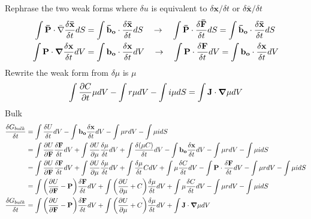 \documentclass[12pt,3p]{article}
\numberwithin{equation}{section}
\begin{document}
Rephrase the two weak forms where $\delta u$ is equivalent to $\delta \mathbf{x} / \delta t$ or $\delta \mathbf{\bar{x}} / \delta t $
\begin{align*}
\int \mathbf{\bar{P}} \cdot \bar{\nabla} \frac{\delta \mathbf{\bar{x}}}{\delta t} dS  &= \int \mathbf{\bar{b}_o} \cdot \frac{\delta \mathbf{\bar{x}}}{\delta t} dS 
\quad \rightarrow \quad 
\int \mathbf{\bar{P}} \cdot \frac{\delta \mathbf{\bar{F}}}{\delta t} dS = \int \mathbf{\bar{b}_o} \cdot \frac{\delta \mathbf{\bar{x}}}{\delta t} dS \\
\int \mathbf{P} \cdot \grad \frac{\delta \mathbf{x}}{\delta t} dV &= \int \mathbf{b_o} \cdot \frac{\delta \mathbf{x}}{\delta t} dV 
\quad \rightarrow \quad 
\int \mathbf{P} \cdot \frac{\delta \mathbf{F}}{\delta t} dV = \int \mathbf{b_o} \cdot \frac{\delta \mathbf{x}}{\delta t} dV
\end{align*}
Rewrite the weak form from $\delta \mu$ is $\mu$
\begin{align*}
\int \pdv{C}{t}  \mu dV - \int r \mu dV - \int i \mu dS = \int \mathbf{J} \cdot \grad \mu dV
\end{align*}
Bulk 
\begin{align*}
 \frac{\delta G_{bulk}}{\delta t} &= \int \frac{\delta U}{\delta t} dV  - \int \mathbf{b_o} \frac{\delta \mathbf{x}}{\delta t} dV - \int \mu r dV - \int \mu i dS \\
 	&= \int \pdv{U}{\mathbf{F}} \frac{\delta \mathbf{F}}{\delta t} dV + \int \pdv{U}{\mu} \frac{\delta \mu}{\delta t} dV + \int \frac{\delta (\mu C)}{\delta t} dV - \int \mathbf{b_o} \frac{\delta \mathbf{x}}{\delta t} dV - \int \mu r dV - \int \mu i dS \\
	 &= \int \pdv{U}{\mathbf{F}} \frac{\delta \mathbf{F}}{\delta t} dV + \int \pdv{U}{\mu} \frac{\delta \mu}{\delta t} dV + \int \frac{\delta \mu}{\delta t} C dV + \int \mu \frac{\delta C}{\delta t} dV- \int \mathbf{P} \cdot \frac{\delta \mathbf{F}}{\delta t} dV - \int \mu r dV - \int \mu i dS \\
	 &= \int \bigg( \pdv{U}{\mathbf{F}} - \mathbf{P} \bigg) \frac{\delta \mathbf{F}}{\delta t} dV + \int \bigg( \pdv{U}{\mu} + C \bigg) \frac{\delta \mu}{\delta t} dV + \int \mu \frac{\delta C}{\delta t} dV - \int \mu r dV - \int \mu i dS \\
 \frac{\delta G_{bulk}}{\delta t} &= \int \bigg( \pdv{U}{\mathbf{F}} - \mathbf{P} \bigg) \frac{\delta \mathbf{F}}{\delta t} dV + \int \bigg( \pdv{U}{\mu} + C \bigg) \frac{\delta \mu}{\delta t} dV + \int \mathbf{J} \cdot \grad \mu dV
\end{align*}
\end{document}
